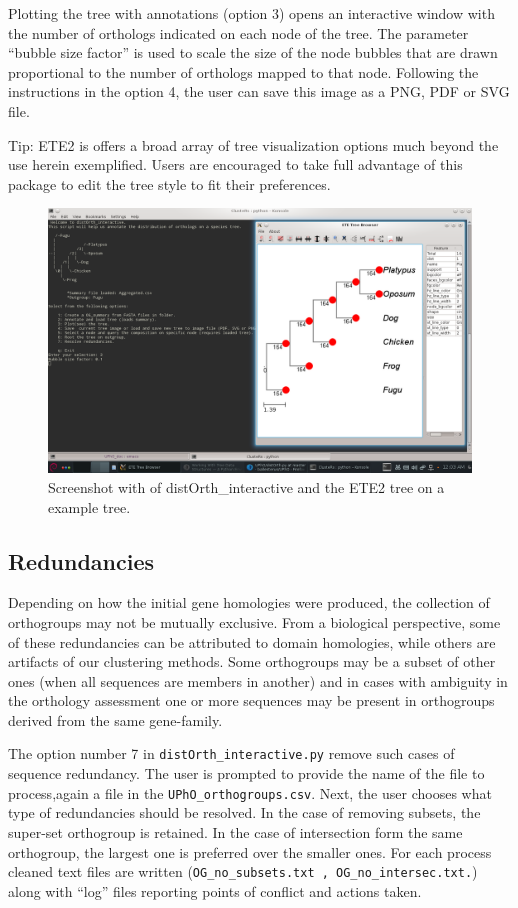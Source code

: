 \documentclass[10pt]{article}
\begin{document}
 Plotting the tree with annotations (option 3) opens an interactive window with the number of orthologs indicated on each node of the tree. The parameter ``bubble size factor'' is used to scale the size of the node bubbles that are drawn proportional to the number of orthologs mapped to that node. Following the instructions in the option 4, the user can save this image as a PNG, PDF or SVG file.

Tip: ETE2 is offers a broad array of tree visualization options much beyond the use herein exemplified. Users are encouraged to take full advantage of this package to edit the tree style to fit their preferences.

\begin{figure}
\includegraphics[width=\textwidth]{distOrthWithBub}
\caption{Screenshot with of distOrth\_interactive and the ETE2 tree on a example tree.}
\end{figure}

\subsection{Redundancies}
Depending on how the initial gene homologies were produced, the collection of orthogroups may not be mutually exclusive. From a biological perspective, some of these redundancies can be attributed to domain homologies, while others are artifacts of our clustering methods. Some orthogroups may be a subset of other ones (when all sequences are members in another)  and in cases with ambiguity in the orthology assessment one or more  sequences may be present  in orthogroups derived from the same gene-family.

The option number 7 in \texttt{distOrth\_interactive.py} remove such cases of sequence redundancy. The user is prompted to provide the name of the file to process,again a file in the \texttt{UPhO\_orthogroups.csv}. Next, the user chooses what type of redundancies should be resolved. In the case of removing subsets, the super-set orthogroup is retained. In the case of intersection form the same orthogroup, the largest one is preferred over the smaller ones. For each process cleaned text files are written (\texttt{OG\_no\_subsets.txt , OG\_no\_intersec.txt.}) along with ``log'' files reporting points of conflict and actions taken.
\end{document}
